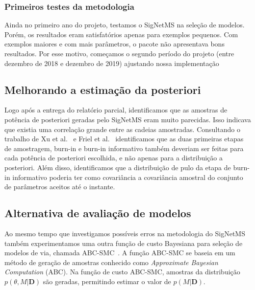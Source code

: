 \documentclass[12pt]{article}
\newcommand{\foreignword}[1]{\textit{#1}}
\begin{document}
\subsubsection{Primeiros testes da metodologia}
Ainda no primeiro ano do projeto, testamos o SigNetMS na seleção de 
modelos. Porém, os resultados eram satisfatórios apenas para exemplos
pequenos. Com exemplos maiores e com mais parâmetros, o pacote não
apresentava bons resultados. Por esse motivo, começamos o segundo
período do projeto (entre dezembro de 2018 e dezembro de 2019) ajustando
nossa implementação 

\subsection{Melhorando a estimação da posteriori}




Logo após a entrega do relatório parcial, identificamos que as amostras
de potência de posteriori geradas pelo SigNetMS eram muito parecidas.
Isso indicava que existia uma correlação grande entre as cadeias
amostradas. Consultando o trabalho de Xu et al.~\cite{Xu2010} e Friel
et al.~\cite{Friel2008} identificamos que as duas primeiras etapas de
amostragem, burn-in e burn-in informativo também deveriam ser feitas
para cada potência de posteriori escolhida, e não apenas para a
distribuição a posteriori. Além disso, identificamos que a distribuição
de pulo da etapa de burn-in informativo poderia ter como covariância a
covariância amostral do conjunto de parâmetros aceitos até o instante. 

\subsection{Alternativa de avaliação de modelos}
Ao mesmo tempo que investigamos possíveis erros na metodologia do
SigNetMS também experimentamos uma outra função de custo Bayesiana para
seleção de modelos de via, chamada ABC-SMC~\cite{Liepe2014}. A função
ABC-SMC se baseia em um método de geração de amostras conhecido como
\foreignword{Approximate Bayesian Computation} (ABC). Na função de custo
ABC-SMC, amostras da distribuição $p(\theta, M | \mathbf{D})$ são 
geradas, permitindo estimar o valor de $p (M | \mathbf{D})$.
\end{document}
